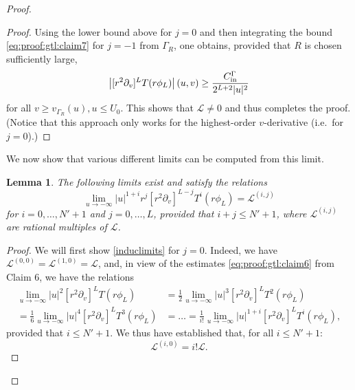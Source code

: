 \documentclass[11pt,english]{article}
\numberwithin{equation}{section}
\newtheorem{lemma}{Lemma}[section]
\theoremstyle{remark}
\theoremstyle{plain}
\theoremstyle{remark}
\newcommand{\pv}{\partial_v}
\renewcommand{\(}{\left(}
\renewcommand{\)}{\right)}
\begin{document}
\begin{proof}
\begin{proof}
Using the lower bound above for $j=0$ and then integrating the bound \eqref{eq:proof:gtl:claim7} for $j=-1$ from $\Gamma_R$, one obtains, provided that $R$ is chosen sufficiently large,
\begin{equation}
\left|[r^2\pv]^{L} T(r\phi_L)\right|(u,v)\geq \frac{\cin}{2^{L+2}|u|^2}
\end{equation} for all $v\geq v_{\Gamma_R}(u), u\leq U_0$.
This shows that $\mathcal L\neq 0$ and thus completes the proof. (Notice that this approach only works for the highest-order $v$-derivative (i.e.\ for $j=0$).)
\end{proof}
	We now show that various different limits can be computed from this limit.	
	\begin{lemma}\label{claim9}
	The following limits exist and satisfy the relations
	\begin{equation}\label{induclimits}
	\lim_{u\to-\infty}|u|^{1+i}r^j[r^2\pv]^{L-j}T^i(r\phi_L)=\mathcal{L}^{(i,j)}
	\end{equation}
	for $i=0,\dots, N'+1$ and $j=0,\dots, L$, provided that $i+j\leq N'+1$, where $\mathcal{L}^{(i,j)}$ are rational multiples of $\mathcal{L}$. 
	\end{lemma}
\begin{proof}
We will first show \eqref{induclimits} for $j=0$. Indeed, we have $\mathcal L^{(0,0)}=\mathcal{L}^{(1,0)}=\mathcal L$, and, in view of the estimates \eqref{eq:proof:gtl:claim6} from Claim 6, we have the relations
\begin{align}
\lim_{u\to-\infty} |u|^2[r^2\pv]^L T(r\phi_L)&=\frac12\lim_{u\to-\infty} |u|^3[r^2\pv]^L T^2(r\phi_L)\\
=\frac16 \lim_{u\to-\infty}|u|^4[r^2\pv]^L T^3(r\phi_L)
&=\dots=\frac{1}{i!}\lim_{u\to-\infty} |u|^{1+i}[r^2\pv]^L T^i(r\phi_L)\nonumber,
\end{align}
provided that $i\leq N'+1$. We thus have established that, for all $i\leq N'+1$:
\begin{equation}
\mathcal{L}^{(i,0)}=i!\mathcal{L}.
\end{equation}


\end{proof}
\end{proof}
\end{document}

